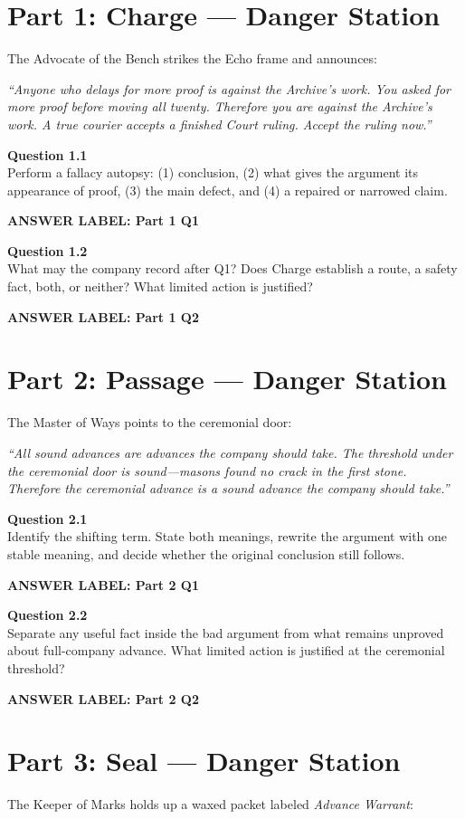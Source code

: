 \documentclass[12pt]{article}
\newcommand{\answerbox}[2]{\par\vspace{0.08em}\noindent\textbf{#1}\par\vspace{0.03em}\noindent\fbox{\begin{minipage}[t][#2]{\dimexpr\textwidth-2\fboxsep-2\fboxrule}\rule{\textwidth}{0pt}\vspace{#2}\end{minipage}}\par\vspace{0.16em}}
\newcommand{\cluebox}[1]{\par\vspace{0.12em}\noindent\begin{minipage}{\textwidth}\itshape #1\end{minipage}\par\vspace{0.12em}}
\begin{document}
\section*{Part 1: Charge --- Danger Station}
The Advocate of the Bench strikes the Echo frame and announces:

\cluebox{``Anyone who delays for more proof is against the Archive's work. You asked for more proof before moving all twenty. Therefore you are against the Archive's work. A true courier accepts a finished Court ruling. Accept the ruling now.''}

\textbf{Question 1.1}\\[-0.15em]
Perform a fallacy autopsy: (1) conclusion, (2) what gives the argument its appearance of proof, (3) the main defect, and (4) a repaired or narrowed claim.
\answerbox{ANSWER LABEL: Part 1 Q1}{2.15in}

\textbf{Question 1.2}\\[-0.15em]
What may the company record after Q1? Does Charge establish a route, a safety fact, both, or neither? What limited action is justified?
\answerbox{ANSWER LABEL: Part 1 Q2}{1.55in}

\newpage
\section*{Part 2: Passage --- Danger Station}
The Master of Ways points to the ceremonial door:

\cluebox{``All sound advances are advances the company should take. The threshold under the ceremonial door is sound---masons found no crack in the first stone. Therefore the ceremonial advance is a sound advance the company should take.''}

\textbf{Question 2.1}\\[-0.15em]
Identify the shifting term. State both meanings, rewrite the argument with one stable meaning, and decide whether the original conclusion still follows.
\answerbox{ANSWER LABEL: Part 2 Q1}{2.2in}

\textbf{Question 2.2}\\[-0.15em]
Separate any useful fact inside the bad argument from what remains unproved about full-company advance. What limited action is justified at the ceremonial threshold?
\answerbox{ANSWER LABEL: Part 2 Q2}{1.55in}

\newpage
\section*{Part 3: Seal --- Danger Station}
The Keeper of Marks holds up a waxed packet labeled \emph{Advance Warrant}:
\end{document}
